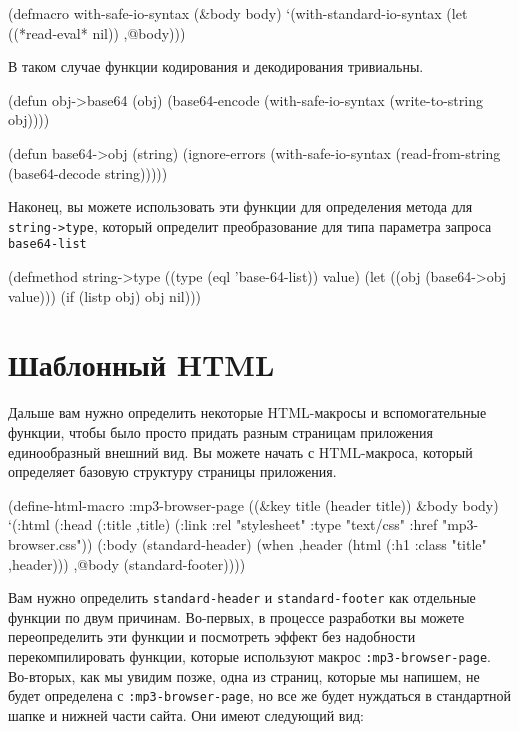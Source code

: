 \begin{myverb}
(defmacro with-safe-io-syntax (&body body)
  `(with-standard-io-syntax
     (let ((*read-eval* nil))
       ,@body)))
\end{myverb}

В таком случае функции кодирования и декодирования тривиальны.

\begin{myverb}
(defun obj->base64 (obj)
  (base64-encode (with-safe-io-syntax (write-to-string obj))))

(defun base64->obj (string)
  (ignore-errors
    (with-safe-io-syntax (read-from-string (base64-decode string)))))
\end{myverb}

Наконец, вы можете использовать эти функции для определения метода для
\lstinline!string->type!, который определит преобразование для типа параметра запроса
\lstinline{base64-list}

\begin{myverb}
(defmethod string->type ((type (eql 'base-64-list)) value)
  (let ((obj (base64->obj value)))
    (if (listp obj) obj nil)))
\end{myverb}

\section{Шаблонный HTML}

Дальше вам нужно определить некоторые HTML-макросы и вспомогательные функции, чтобы было
просто придать разным страницам приложения единообразный внешний вид. Вы можете начать с
HTML-макроса, который определяет базовую структуру страницы приложения.

\begin{myverb}
(define-html-macro :mp3-browser-page ((&key title (header title)) &body body)
  `(:html
     (:head
      (:title ,title)
      (:link :rel "stylesheet" :type "text/css" :href "mp3-browser.css"))
     (:body
      (standard-header)
      (when ,header (html (:h1 :class "title" ,header)))
      ,@body
      (standard-footer))))
\end{myverb}

Вам нужно определить \lstinline{standard-header} и \lstinline{standard-footer} как отдельные функции
по двум причинам. Во-первых, в процессе разработки вы можете переопределить эти функции и
посмотреть эффект без надобности перекомпилировать функции, которые используют
макрос \lstinline{:mp3-browser-page}. Во-вторых, как мы увидим позже, одна из страниц, которые
мы напишем, не будет определена с \lstinline{:mp3-browser-page}, но все же будет нуждаться в
стандартной шапке и нижней части сайта. Они имеют следующий вид:

